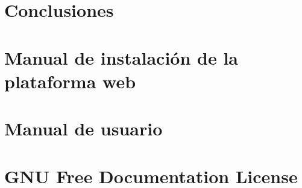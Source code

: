 \documentclass[a4paper, 12pt]{book}
\begin{document}
\chapter{Conclusiones}
\label{chap:conclusiones}
%

\appendix

%

\chapter{Manual de instalación de la plataforma web}
\label{chap:manual_instalacion}


\chapter{Manual de usuario}
\label{chap:manual_usuario}
%

\chapter{GNU Free Documentation License}
\label{sec:fdl}




\end{document}

